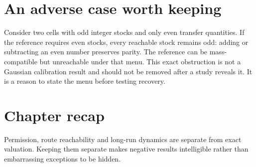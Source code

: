 \section*{An adverse case worth keeping}
Consider two cells with odd integer stocks and only even transfer quantities.
If the reference requires even stocks, every reachable stock remains odd:
adding or subtracting an even number preserves parity. The reference can
be mass-compatible but unreachable under that menu. This exact obstruction
is not a Gaussian calibration result and should not be removed after a
study reveals it. It is a reason to state the menu before testing recovery.

\section*{Chapter recap}
Permission, route reachability and long-run dynamics are separate from exact
valuation. Keeping them separate makes negative results intelligible rather
than embarrassing exceptions to be hidden.
